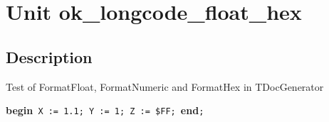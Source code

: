 \documentclass{report}
\begin{document}
\newlength{\tmplength}
\chapter{Unit ok{\_}longcode{\_}float{\_}hex}
\section{Description}
Test of FormatFloat, FormatNumeric and FormatHex in TDocGenerator\hfill\vspace*{1ex}



\texttt{}\textbf{begin}\texttt{~X~:=~1.1;~Y~:=~1;~Z~:=~{\$}FF;~}\textbf{end}\texttt{;\\
}
\end{document}
